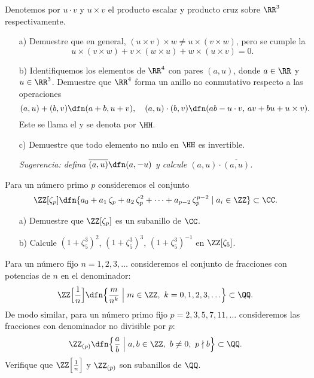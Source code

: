 \begin{ejercicio}[Cuaterniones]
  \label{ejerc:cuaterniones}
  Denotemos por $u\cdot v$ y $u\times v$ el producto escalar y producto cruz
  sobre $\RR^3$ respectivamente.

  \begin{enumerate}
  \item[a)] Demuestre que en general,
    $(u\times v)\times w \ne u\times (v\times w)$, pero se cumple
    la 
    $$u \times (v \times w) + v \times (w \times u) + w \times (u \times  v) = 0.$$

  \item[b)] Identifiquemos los elementos de $\RR^4$ con pares $(a,u)$, donde
    $a \in \RR$ y $u \in \RR^3$. Demuestre que $\RR^4$ forma un anillo no
    conmutativo respecto a las operaciones
    $$(a,u) + (b,v) \dfn (a+b, u+v), \quad (a,u) \cdot (b,v) \dfn (ab - u\cdot v, \, av + bu + u\times v).$$
    Este se llama el  y se denota por $\HH$.

  \item[c)] Demuestre que todo elemento no nulo en $\HH$ es invertible.

    \emph{Sugerencia: defina $\overline{(a,u)} \dfn (a,-u)$ y calcule
      $(a,u)\cdot \overline{(a,u)}$.}
  \end{enumerate}
\end{ejercicio}

\begin{ejercicio}
  Para un número primo $p$ consideremos el conjunto
  $$\ZZ [\zeta_p] \dfn \{ a_0 + a_1\,\zeta_p + a_2\,\zeta_p^2 + \cdots + a_{p-2}\,\zeta_p^{p-2} \mid a_i\in\ZZ \} \subset \CC.$$

  \begin{enumerate}
  \item[a)] Demuestre que $\ZZ [\zeta_p]$ es un subanillo de $\CC$.

  \item[b)] Calcule $(1 + \zeta_5^3)^2$, $(1 + \zeta_5^3)^3$,
    $(1 + \zeta_5^3)^{-1}$ en $\ZZ [\zeta_5]$.
  \end{enumerate}
\end{ejercicio}

\begin{ejercicio}
  Para un número fijo $n = 1,2,3,\ldots$ consideremos el conjunto de fracciones
  con potencias de $n$ en el denominador:
  $$\ZZ \Bigl[\frac{1}{n}\Bigr] \dfn \Bigl\{ \frac{m}{n^k} \Bigm| m\in \ZZ, ~ k = 0, 1, 2, 3, \ldots \Bigr\} \subset \QQ.$$
  De modo similar, para un número primo fijo $p = 2,3,5,7,11,\ldots$
  consideremos las fracciones con denominador no divisible por $p$:
  $$\ZZ_{(p)} \dfn \Bigl\{ \frac{a}{b} \Bigm| a,b\in \ZZ, ~ b\ne 0, ~ p\nmid b \Bigr\} \subset \QQ.$$
  Verifique que $\ZZ \Bigl[\frac{1}{n}\Bigr]$ y $\ZZ_{(p)}$ son subanillos de
  $\QQ$.
\end{ejercicio}

